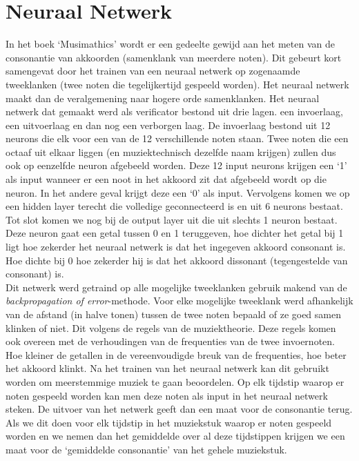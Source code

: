 \section{Neuraal Netwerk}
\label{OBM:NN}
In het boek `Musimathics' \cite{book:musimathics} wordt er een gedeelte gewijd aan het meten van de consonantie van akkoorden (samenklank van meerdere noten). Dit gebeurt kort samengevat door het trainen van een neuraal netwerk op zogenaamde tweeklanken (twee noten die tegelijkertijd gespeeld worden). Het neuraal netwerk maakt dan de veralgemening naar hogere orde samenklanken. Het neuraal netwerk dat gemaakt werd als verificator bestond uit drie lagen. een invoerlaag, een uitvoerlaag en dan nog een verborgen laag. De invoerlaag bestond uit 12 neurons die elk voor een van de 12 verschillende noten staan. Twee noten die een octaaf uit elkaar liggen (en muziektechnisch dezelfde naam krijgen) zullen dus ook op eenzelfde neuron afgebeeld worden. Deze 12 input neurons krijgen een `1' als input wanneer er een noot in het akkoord zit dat afgebeeld wordt op die neuron. In het andere geval krijgt deze een `0' als input. Vervolgens komen we op een hidden layer terecht die volledige geconnecteerd is en uit 6 neurons bestaat. Tot slot komen we nog bij de output layer uit die uit slechts 1 neuron bestaat. Deze neuron gaat een getal tussen 0 en 1 teruggeven, hoe dichter het getal bij 1 ligt hoe zekerder het neuraal netwerk is dat het ingegeven akkoord consonant is. Hoe dichte bij 0 hoe zekerder hij is dat het akkoord dissonant (tegengestelde van consonant) is.\\
Dit netwerk werd getraind op alle mogelijke tweeklanken gebruik makend van de \textit{backpropagation of error}-methode\cite{url:backpropagation}. Voor elke mogelijke tweeklank werd afhankelijk van de afstand (in halve tonen) tussen de twee noten bepaald of ze goed samen klinken of niet. Dit volgens de regels van de muziektheorie. Deze regels komen ook overeen met de verhoudingen van de frequenties van de twee invoernoten. Hoe kleiner de getallen in de vereenvoudigde breuk van de frequenties, hoe beter het akkoord klinkt. Na het trainen van het neuraal netwerk kan dit gebruikt worden om meerstemmige muziek te gaan beoordelen. Op elk tijdstip waarop er noten gespeeld worden kan men deze noten als input in het neuraal netwerk steken. De uitvoer van het netwerk geeft dan een maat voor de consonantie terug. Als we dit doen voor elk tijdstip in het muziekstuk waarop er noten gespeeld worden en we nemen dan het gemiddelde over al deze tijdstippen krijgen we een maat voor de `gemiddelde consonantie' van het gehele muziekstuk.\\
